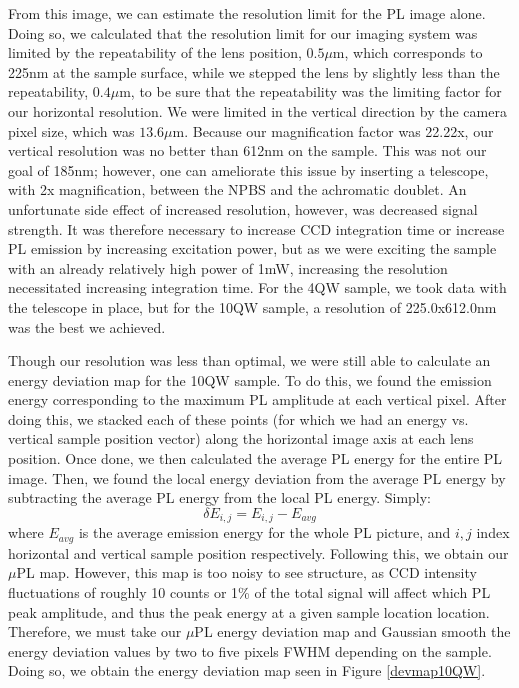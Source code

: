 \indent From this image, we can estimate the resolution limit for the PL image alone. Doing so, we calculated that the resolution limit for our imaging system was limited by the repeatability of the lens position, $0.5\mu$m, which corresponds to 225nm at the sample surface, while we stepped the lens by slightly less than the repeatability, $0.4\mu$m, to be sure that the repeatability was the limiting factor for our horizontal resolution. We were limited in the vertical direction by the camera pixel size, which was $13.6\mu$m. Because our magnification factor was 22.22x, our vertical resolution was no better than 612nm on the sample. This was not our goal of 185nm; however, one can ameliorate this issue by inserting a telescope, with 2x magnification, between the NPBS and the achromatic doublet. An unfortunate side effect of increased resolution, however, was decreased signal strength. It was therefore necessary to increase CCD integration time or increase PL emission by increasing excitation power, but as we were exciting the sample with an already relatively high power of 1mW, increasing the resolution necessitated increasing integration time. For the 4QW sample, we took data with the telescope in place, but for the 10QW sample, a resolution of 225.0x612.0nm was the best we achieved.
 


\indent Though our resolution was less than optimal, we were still able to calculate an energy deviation map for the 10QW sample. To do this, we found the emission energy corresponding to the maximum PL amplitude at each vertical pixel. After doing this, we stacked each of these points (for which we had an energy vs. vertical sample position vector) along the horizontal image axis at each lens position. Once done, we then calculated the average PL energy for the entire PL image. Then, we found the local energy deviation from the average PL energy by subtracting the average PL energy from the local PL energy. Simply: 
\begin{equation}
\delta E_{i,j} = E_{i,j}-E_{avg}
\end{equation}
where $E_{avg}$ is the average emission energy for the whole PL picture, and $i,j$ index horizontal and vertical sample position respectively. Following this, we obtain our $\mu$PL map. However, this map is too noisy to see structure, as CCD intensity fluctuations of roughly 10 counts or 1\% of the total signal will affect which PL peak amplitude, and thus the peak energy at a given sample location location. Therefore, we must take our $\mu$PL energy deviation map and Gaussian smooth the energy deviation values by two to five pixels FWHM depending on the sample. Doing so, we obtain the energy deviation map seen in Figure \ref{devmap10QW}.

